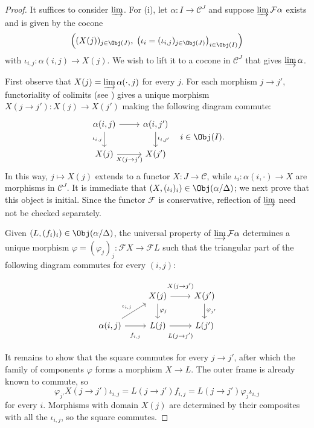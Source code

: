 \begin{proof}
	It suffices to consider $\varinjlim$. For (i), let
	$\alpha: I \to \mathcal{C}^J$ and suppose $\varinjlim \mathcal{F}\alpha$
	exists and is given by the cocone
	\[ \left( (X(j))_{j \in \Obj(J)}, \; \left( \iota_i = (\iota_{i, j})_{j \in \Obj(J)} \right)_{i \in \Obj(I)} \right) \]
	with $\iota_{i,j}: \alpha(i, j) \to X(j)$. We wish to lift it to a cocone
	in $\mathcal{C}^J$ that gives $\varinjlim \alpha$.

	First observe that $X(j) = \varinjlim \alpha(\cdot, j)$ for every $j$.
	For each morphism $j \to j'$, functoriality of colimits (see
	\cite[Lemma 2.7.4]{Li1}) gives a unique morphism
	$X(j \to j'): X(j) \to X(j')$ making the following diagram commute:
	\[\begin{tikzcd}
		\alpha(i, j) \arrow[r] \arrow[d, "{\iota_{i, j}}"'] & \alpha(i, j') \arrow[d, "{\iota_{i, j'}}"] \\
		X(j) \arrow[r, "{X(j \to j')}"'] & X(j')
	\end{tikzcd} \quad i \in \Obj(I). \]
	In this way, $j \mapsto X(j)$ extends to a functor
	$X: J \to \mathcal{C}$, while $\iota_i: \alpha(i, \cdot) \to X$ are
	morphisms in $\mathcal{C}^J$. It is immediate that
	$(X, (\iota_i)_i) \in \Obj(\alpha/\Delta)$; we next prove that this object
	is initial. Since the functor $\mathcal{F}$ is conservative, reflection of
	$\varinjlim$ need not be checked separately.

	Given $(L, (f_i)_i) \in \Obj(\alpha/\Delta)$, the universal property of
	$\varinjlim \mathcal{F}\alpha$ determines a unique morphism
	$\varphi = (\varphi_j)_j : \mathcal{F}X \to \mathcal{F}L$ such that the
	triangular part of the following diagram commutes for every $(i, j)$:
	\[\begin{tikzcd}
		& X(j) \arrow[d, "\varphi_j"] \arrow[r, "{X(j \to j')}" inner sep=0.8em] & X(j') \arrow[d, "\varphi_{j'}"] \\
		\alpha(i, j) \arrow[ru, "{\iota_{i,j}}"] \arrow[r, "f_{i, j}"' inner sep=0.8em] & L(j) \arrow[r, "{L(j \to j')}"' inner sep=0.8em] & L(j')
	\end{tikzcd}\]
	It remains to show that the square commutes for every $j \to j'$, after
	which the family of components $\varphi$ forms a morphism $X \to L$. The
	outer frame is already known to commute, so
	\[ \varphi_{j'} X(j \to j') \iota_{i, j} = L(j \to j') f_{i, j} = L(j \to j') \varphi_j \iota_{i, j} \]
	for every $i$. Morphisms with domain $X(j)$ are determined by their
	composites with all the $\iota_{i,j}$, so the square commutes.


\end{proof}
